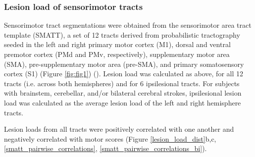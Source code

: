 \documentclass[10pt]{article}
\begin{document}
\subsubsection*{Lesion load of sensorimotor tracts}
Sensorimotor tract segmentations were obtained from the sensorimotor area tract template (SMATT), a set of 12 tracts derived from probabilistic tractography seeded in the left and right primary motor cortex (M1), dorsal and ventral premotor cortex (PMd and PMv, respectively), supplementary motor area (SMA), pre-supplementary motor area (pre-SMA), and primary somatosensory cortex (S1) (Figure \ref{fig:fig1}) (\cite{Archer2018-ti}). Lesion load was calculated as above, for all 12 tracts (i.e. across both hemispheres) and for 6 ipsilesional tracts. For subjects with brainstem, cerebellar, and/or bilateral cerebral strokes, ipsilesional lesion load was calculated as the average lesion load of the left and right hemisphere tracts.

Lesion loads from all tracts were positively correlated with one another and negatively correlated with motor scores (Figure \ref{lesion_load_dist}b,c, \ref{smatt_pairwise_correlations}, \ref{smatt_pairwise_correlations_bi}). 
\end{document}
